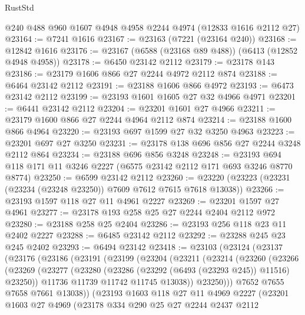 \begin{lexlean}{RustStd}
\begin{coremodule}
    @240
    @488
    @960
    @1607
    @4948
    @4958
    @2244
    @4974
    (@12833 @1616 @2112 @27)
@23164 := @7241 @1616
@23167 := @23163 (@7221 (@23164 @240))
@23168 := @12842 @1616
@23176 := @23167 (@6588 (@23168 @89 @488)) (@6413 (@12852 @4948 @4958))
@23178 := @6450 @23142 @2112
@23179 := @23178 @143
@23186 := @23179 @1606 @866 @27 @2244 @4972 @2112 @874
@23188 := @6464 @23142 @2112
@23191 := @23188 @1606 @866 @4972
@23193 := @6473 @23142 @2112
@23199 := @23193 @1601 @1605 @27 @32 @4966 @4971
@23201 := @6441 @23142 @2112
@23204 := @23201 @1601 @27 @4966
@23211 := @23179 @1600 @866 @27 @2244 @4964 @2112 @874
@23214 := @23188 @1600 @866 @4964
@23220 := @23193 @697 @1599 @27 @32 @3250 @4963
@23223 := @23201 @697 @27 @3250
@23231 := @23178 @138 @696 @856 @27 @2244 @3248 @2112 @864
@23234 := @23188 @696 @856 @3248
@23248 := @23193 @694 @118 @171 @11 @3246 @2227 (@6575 @23142 @2112 @171 @693 @3246 @8770 @8774)
@23250 := @6599 @23142 @2112
@23260 := @23220 (@23223 (@23231 (@23234 (@23248 @23250)) @7609 @7612 @7615 @7618 @13038))
@23266 := @23193 @1597 @118 @27 @11 @4961 @2227
@23269 := @23201 @1597 @27 @4961
@23277 := @23178 @193 @258 @25 @27 @2244 @2404 @2112 @972
@23280 := @23188 @258 @25 @2404
@23286 := @23193 @256 @118 @23 @11 @2402 @2227
@23288 := @6485 @23142 @2112
@23292 := @23288 @245 @23 @245 @2402
@23293 := @6494 @23142
@23418 := @23103
    (@23124
      (@23137
        (@23176
          (@23186
            (@23191
              (@23199
                (@23204
                  (@23211
                    (@23214
                      (@23260
                        (@23266
                          (@23269
                            (@23277
                              (@23280 (@23286 (@23292 (@6493 (@23293 @245)) @11516) @23250))
                              @11736
                              @11739
                              @11742
                              @11745
                              @13038))
                          @23250)))
                    @7652
                    @7655
                    @7658
                    @7661
                    @13038))
                (@23193
                  @1603
                  @118
                  @27
                  @11
                  @4969
                  @2227
                  (@23201
                    @1603
                    @27
                    @4969
                    (@23178
                      @334
                      @290
                      @25
                      @27
                      @2244
                      @2437
                      @2112

\end{coremodule}
\end{lexlean}
